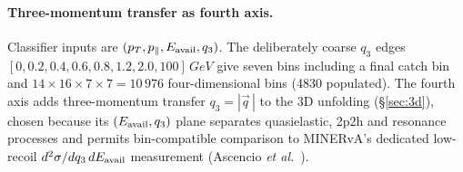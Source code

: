 \paragraph{Three-momentum transfer as fourth axis.} Classifier inputs are $(p_{T},p_{\parallel},E_{\mathrm{avail}},q_{3})$. The deliberately coarse $q_{3}$ edges $[0,0.2,0.4,0.6,0.8,1.2,2.0,100]\,\si{GeV}$ give seven bins including a final catch bin and $14\times16\times7\times7=10\,976$ four-dimensional bins (4830 populated). The fourth axis adds three-momentum transfer $q_{3}=|\vec{q}\,|$ to the 3D unfolding (\S\ref{sec:3d}), chosen because its $(E_{\mathrm{avail}},q_{3})$ plane separates quasielastic, 2p2h and resonance processes and permits bin-compatible comparison to MINERvA's dedicated low-recoil $d^{2}\sigma/dq_{3}\,dE_{\mathrm{avail}}$ measurement (Ascencio \emph{et al.}~\cite{MINERvA:2022incl}).

